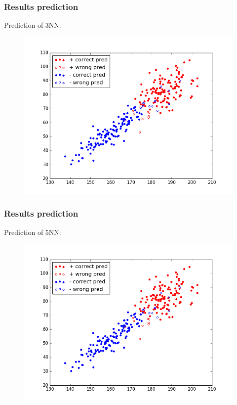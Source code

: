 \documentclass{beamer}
\begin{document}
\begin{frame}
\frametitle{Results prediction}
Prediction of 3NN:
\begin{figure}
	\includegraphics[height=0.8\textheight]{graphics/3NNPrediction}
\end{figure}
\end{frame} 

\begin{frame}
\frametitle{Results prediction}
Prediction of 5NN:
\begin{figure}
	\includegraphics[height=0.8\textheight]{graphics/5NNPrediction}
\end{figure}
\end{frame} 
\end{document}
